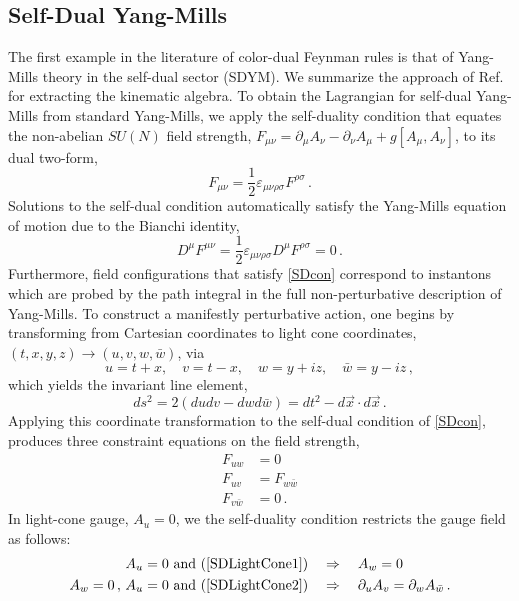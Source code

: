 \documentclass[11pt,letter]{article}
\begin{document}
\subsection{Self-Dual Yang-Mills} The first example in the literature
of color-dual Feynman rules is that of Yang-Mills theory in the
self-dual sector (SDYM).  We summarize the approach of
Ref.~\cite{Monteiro2011pc} for extracting the kinematic algebra.
To obtain the Lagrangian for self-dual Yang-Mills from standard Yang-Mills, we apply the
self-duality condition that equates the non-abelian $SU(N)$ field
strength,
$F_{\mu\nu} = \partial_\mu A_\nu -\partial_\nu A_\mu + g[A_\mu
,A_\nu]$, to its dual two-form,
\begin{equation}
  \label{SDcon} F_{\mu\nu} = \frac{1}{2}
  \varepsilon_{\mu\nu\rho\sigma}F^{\rho\sigma} \,.
\end{equation}
Solutions to the self-dual condition automatically satisfy the
Yang-Mills equation of motion due to the Bianchi identity,
\begin{equation}
D^\mu F^{\mu\nu} = \frac{1}{2} \varepsilon_{\mu\nu\rho\sigma}D^\mu F^{\rho\sigma} = 0 \,.
\end{equation}
Furthermore, field configurations that satisfy \cref{SDcon} correspond to instantons which are probed by the path integral in the full non-perturbative description of Yang-Mills. To construct a manifestly perturbative action, one begins by
transforming from Cartesian coordinates to light cone coordinates,
$(t,x,y,z) \rightarrow (u,v,w,\bar{w})$, via
\begin{equation}
u = t+x,\quad v=t-x, \quad w = y+iz, \quad \bar{w} = y-iz\, ,
\end{equation}
which yields the invariant line element,
\begin{equation}
ds^2 = 2(dudv - dwd\bar{w}) = dt^2 - d\vec{x}\cdot d\vec{x} \,.
\end{equation}
Applying this coordinate transformation to the self-dual condition of
\cref{SDcon}, produces three constraint equations on the field strength,
\begin{align} \label{SDLightCone1}
F_{uw} &=0
\\
 \label{SDLightCone2}
 F_{uv} &= F_{w\bar{w}}
\\
 \label{SDLightCone3}
 F_{v\bar{w}} &= 0\,.
\end{align}
In light-cone gauge, $A_u=0$, we the self-duality condition restricts the gauge field as follows:
\begin{align}
  A_u=0 \text{ and } (\ref{SDLightCone1}) \quad&\Rightarrow \quad A_w=0\\
  A_w=0\,,\,A_u=0 \text{ and } (\ref{SDLightCone2}) \quad&\Rightarrow \quad \partial_u A_v = \partial_w A_{\bar{w}} \label{eq:sd-divs}\,.
\end{align}
\end{document}
